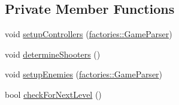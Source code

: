 \subsection*{\-Private \-Member \-Functions}
\begin{DoxyCompactItemize}
\item 
void \hyperlink{classmodels_1_1Game_a2e8709abb710f1e457708b484e8f74b4}{setup\-Controllers} (\hyperlink{classfactories_1_1GameParser}{factories\-::\-Game\-Parser})
\item 
void \hyperlink{classmodels_1_1Game_a96212db580e00ec03ff329a79e6acae5}{determine\-Shooters} ()
\item 
void \hyperlink{classmodels_1_1Game_a3d8ec799ce9642902f7c3afb3ae53a92}{setup\-Enemies} (\hyperlink{classfactories_1_1GameParser}{factories\-::\-Game\-Parser})
\item 
bool \hyperlink{classmodels_1_1Game_a84d775508848479bc8b2bc71666a6b70}{check\-For\-Next\-Level} ()
\end{DoxyCompactItemize}
